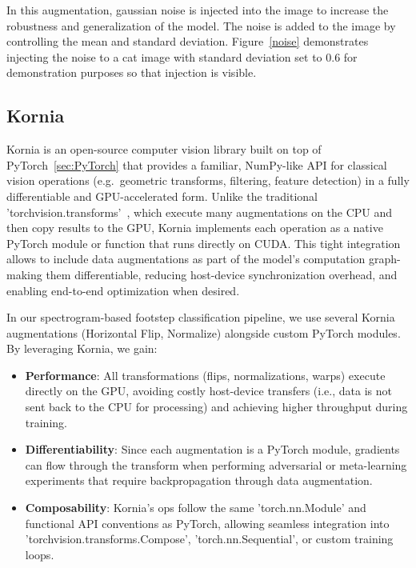 In this augmentation, gaussian noise is injected into the image to increase the robustness and generalization of the model. The noise is added to the image by controlling the mean and standard deviation. Figure~\ref{noise} demonstrates injecting the noise to a cat image with standard deviation set to 0.6 for demonstration purposes so that injection is visible.

\subsection{Kornia}

Kornia is an open-source computer vision library built on top of PyTorch~\ref{sec:PyTorch} that provides a familiar, NumPy-like API for classical vision operations (e.g.\ geometric transforms, filtering, feature detection) in a fully differentiable and GPU-accelerated form. Unlike the traditional 'torchvision.transforms'~\cite{torchvision2024}, which execute many augmentations on the CPU and then copy results to the GPU, Kornia implements each operation as a native PyTorch module or function that runs directly on CUDA. This tight integration allows to include data augmentations as part of the model's computation graph-making them differentiable, reducing host-device synchronization overhead, and enabling end-to-end optimization when desired.

In our spectrogram-based footstep classification pipeline, we use several Kornia augmentations (Horizontal Flip, Normalize) alongside custom PyTorch modules.  By leveraging Kornia, we gain:

\begin{itemize}
  \item \textbf{Performance}: All transformations (flips, normalizations, warps) execute directly on the GPU, avoiding costly host-device transfers (i.e., data is not sent back to the CPU for processing) and achieving higher throughput during training.
  \item \textbf{Differentiability}: Since each augmentation is a PyTorch module, gradients can flow through the transform when performing adversarial or meta-learning experiments that require backpropagation through data augmentation.
  \item \textbf{Composability}: Kornia's ops follow the same 'torch.nn.Module' and functional API conventions as PyTorch, allowing seamless integration into 'torchvision.transforms.Compose', 'torch.nn.Sequential', or custom training loops.
\end{itemize}

